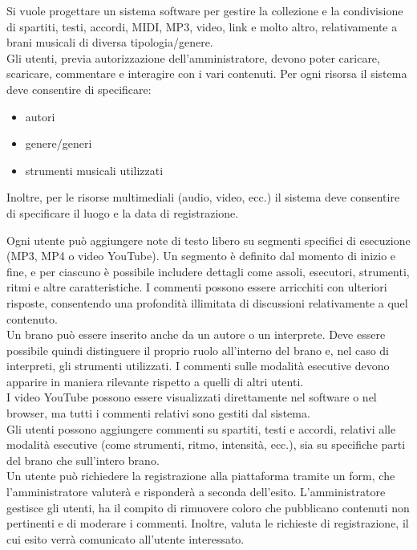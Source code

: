 \documentclass[a4paper]{article}
\begin{document}
Si vuole progettare un sistema software per gestire la collezione e la condivisione 
di spartiti, testi, accordi, MIDI, MP3, video, link e molto altro, relativamente a brani 
musicali di diversa tipologia/genere.\\[2ex]

Gli utenti, previa autorizzazione dell'amministratore, devono poter caricare, 
scaricare, commentare e interagire con i vari contenuti. Per ogni risorsa il sistema deve
consentire di specificare:
\begin{itemize}
    \item autori
    \item genere/generi
    \item strumenti musicali utilizzati
\end{itemize}

Inoltre, per le risorse multimediali (audio, video, ecc.) il sistema deve
consentire di specificare il luogo e la data di registrazione.

Ogni utente può aggiungere note di testo libero su segmenti specifici di esecuzione (MP3, MP4 o video YouTube).  
Un segmento è definito dal momento di inizio e fine, e per ciascuno è possibile includere dettagli come assoli, esecutori, strumenti,
ritmi e altre caratteristiche. I commenti possono essere arricchiti con ulteriori 
risposte, consentendo una profondità illimitata di discussioni relativamente a quel 
contenuto.\\[2ex]

Un brano può essere inserito anche da un autore o un interprete. Deve essere possibile 
quindi distinguere il proprio ruolo all’interno del brano e, nel caso di interpreti, 
gli strumenti utilizzati. I commenti sulle modalità esecutive devono apparire in maniera 
rilevante rispetto a quelli di altri utenti.\\[2ex]

I video YouTube possono essere visualizzati direttamente nel software o nel browser, 
ma tutti i commenti relativi sono gestiti dal sistema.\\[2ex]

Gli utenti possono aggiungere commenti su spartiti, testi e accordi, 
relativi alle modalità esecutive (come strumenti, ritmo, intensità, ecc.), sia su 
specifiche parti del brano che sull'intero brano.\\[2ex]

Un utente può richiedere la registrazione alla piattaforma tramite un form, che 
l'amministratore valuterà e risponderà a seconda dell’esito.  
L'amministratore gestisce gli utenti, ha il compito di rimuovere coloro che pubblicano contenuti non pertinenti 
e di moderare i commenti. Inoltre, valuta le richieste di registrazione, il cui esito verrà comunicato 
all’utente interessato.\\[2ex]
\end{document}
